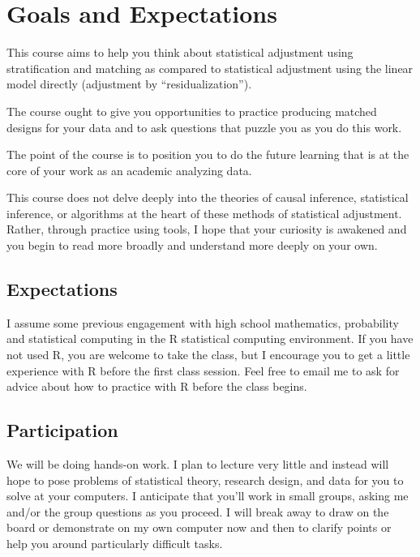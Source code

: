 \documentclass[10pt]{article}
\newenvironment{introstuff} {\setcounter{secnumdepth}{0}%
  \titlespacing*{\section}{-.75in}{1em}{0em}{}%
  \titleformat{\section}[hang]{\large\bfseries}{\hspace{-.75in}\thesection}{.5em}{}{}  
  \titleformat{\subsection}[leftmargin]{\itshape\filleft}{\thesubsection}{.5em}{\hspace{-.75in}}{}%
  \titleformat{\subsubsection}[leftmargin]{\itshape\filleft}{\thesubsubsection}{.2em}{\hspace{-.75in}}{}%
  \titleformat{\paragraph}[hang]{\bfseries}{\theparagraph}{0em}{}{}%
  \titlespacing{\subsection}{2pc}{1.5ex plus .1ex minus .2ex}{1pc}%
  \titlespacing{\paragraph}{0em}{1ex}{0ex plus .1ex minus .1ex}%
  \titlespacing{\subsubsection}{2pc}{1.5ex plus .1ex minus .2ex}{1pc}%
} {%
}
\begin{document}
\begin{introstuff}
  \section{Goals and Expectations}

  This course aims to help you think about statistical adjustment using
  stratification and matching as compared to statistical adjustment using the
  linear model directly (adjustment by ``residualization'').

  The course ought to give you opportunities to practice producing
  matched designs for your data and to ask questions that puzzle you as
  you do this work.

  The point of the course is to position you to do the future learning
  that is at the core of your work as an academic analyzing data.

  This course does not delve deeply into the theories of causal
  inference, statistical inference, or algorithms at the heart of these
  methods of statistical adjustment. Rather, through practice using
  tools, I hope that your curiosity is awakened and you begin to read
  more broadly and understand more deeply on your own.

  \subsection{Expectations}

  I assume some previous engagement with high school mathematics,
  probability and statistical computing in the R statistical computing
  environment. If you have not used R, you are welcome to take the
  class, but I encourage you to get a little experience with R before
  the first class session. Feel free to email me to ask for advice about
  how to practice with R before the class begins.

  \subsection{Participation}

  We will be doing hands-on work. I plan to lecture very little and
  instead will hope to pose problems of statistical theory, research
  design, and data for you to solve at your computers. I anticipate that
  you'll work in small groups, asking me and/or the group questions as
  you proceed. I will break away to draw on the board or demonstrate on
  my own computer now and then to clarify points or help you around
  particularly difficult tasks.


\end{introstuff}
\end{document}
